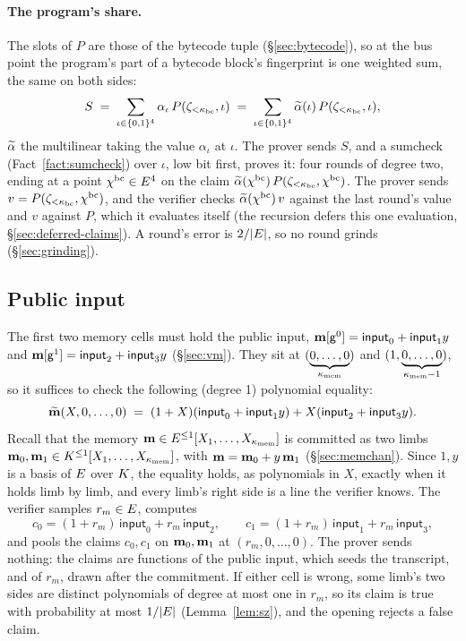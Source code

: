 \paragraph{The program's share.} The slots of $P$ are those of the bytecode tuple (\S\ref{sec:bytecode}), so at the bus point the program's part of a bytecode block's fingerprint is one weighted sum, the same on both sides:
\[
  S\;=\;\sum_{\iota\in\{0,1\}^{4}}\alpha_\iota\,P(\zeta_{<\kappa_{\mathrm{bc}}},\iota)\;=\;\sum_{\iota\in\{0,1\}^{4}}\widetilde{\alpha}(\iota)\,P(\zeta_{<\kappa_{\mathrm{bc}}},\iota),
\]
$\widetilde{\alpha}$ the multilinear taking the value $\alpha_\iota$ at $\iota$. The prover sends $S$, and a sumcheck (Fact~\ref{fact:sumcheck}) over $\iota$, low bit first, proves it: four rounds of degree two, ending at a point $\chi^{\mathrm{bc}}\in E^{4}$ on the claim $\widetilde{\alpha}(\chi^{\mathrm{bc}})\,P(\zeta_{<\kappa_{\mathrm{bc}}},\chi^{\mathrm{bc}})$. The prover sends $v=P(\zeta_{<\kappa_{\mathrm{bc}}},\chi^{\mathrm{bc}})$, and the verifier checks $\widetilde{\alpha}(\chi^{\mathrm{bc}})\,v$ against the last round's value and $v$ against $P$, which it evaluates itself (the recursion defers this one evaluation, \S\ref{sec:deferred-claims}). A round's error is $2/|E|$, so no round grinds (\S\ref{sec:grinding}).

\subsection{Public input}\label{sec:e2e-pi}

The first two memory cells must hold the public input, $\mathbf{m}[\mathsf{g}^{0}]=\textsf{input}_0+\textsf{input}_1y$ and $\mathbf{m}[\mathsf{g}^{1}]=\textsf{input}_2+\textsf{input}_3y$ (\S\ref{sec:vm}). They sit at $(\underbrace{0,\dots,0}_{\kappa_{\mathrm{mem}}})$ and $(1,\underbrace{0,\dots,0}_{\kappa_{\mathrm{mem}}-1})$, so it suffices to check the following (degree 1) polynomial equality:
\[
  \widetilde{\mathbf{m}}(X,0,\dots,0)\;=\;(1+X)(\textsf{input}_0+\textsf{input}_1y)+X(\textsf{input}_2+\textsf{input}_3y).
\]
Recall that the memory $\mathbf{m}\in E^{\le1}[X_1,\dots,X_{\kappa_{\mathrm{mem}}}]$ is committed as two limbs $\mathbf{m}_0,\mathbf{m}_1\in K^{\le1}[X_1,\dots,X_{\kappa_{\mathrm{mem}}}]$, with $\mathbf{m}=\mathbf{m}_0+y\,\mathbf{m}_1$ (\S\ref{sec:memchan}). Since $1,y$ is a basis of $E$ over $K$, the equality holds, as polynomials in $X$, exactly when it holds limb by limb, and every limb's right side is a line the verifier knows. The verifier samples $r_m\in E$, computes
\[
  c_0=(1+r_m)\,\textsf{input}_0+r_m\,\textsf{input}_2,\qquad c_1=(1+r_m)\,\textsf{input}_1+r_m\,\textsf{input}_3,
\]
and pools the claims $c_0,c_1$ on $\mathbf{m}_0,\mathbf{m}_1$ at $(r_m,0,\dots,0)$. The prover sends nothing: the claims are functions of the public input, which seeds the transcript, and of $r_m$, drawn after the commitment. If either cell is wrong, some limb's two sides are distinct polynomials of degree at most one in $r_m$, so its claim is true with probability at most $1/|E|$ (Lemma~\ref{lem:sz}), and the opening rejects a false claim.

